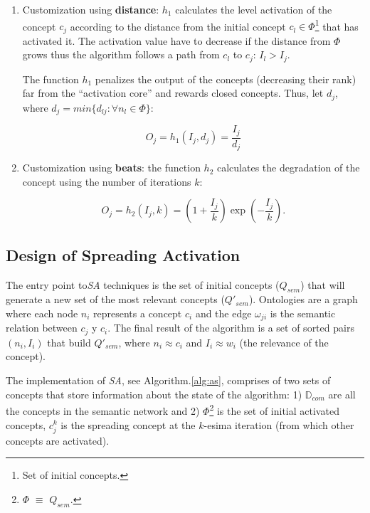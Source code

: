 \documentclass{llncs}
\begin{document}
\begin{description}
\begin{enumerate}
\item Customization using {\bf distance}: $h_1$ calculates the level activation
of the concept $c_j$  according to the distance from the initial concept $c_l
\in \Phi$\footnote{Set of initial concepts.} that has activated it. The
activation value have to decrease if the distance from $\Phi$ grows thus
the algorithm follows a path from $c_l$ to $c_j$: $I_l > I_j$.


The function $h_1$ penalizes the output of the concepts (decreasing their rank)
far from the ``activation core'' and rewards closed concepts. Thus, let $d_j$,
where $d_j = min\{d_{lj}:\forall n_l \in \Phi\}$:


\begin{equation}
 O_j = h_1(I_j,d_j)= \frac{I_j} {d_j}
\end{equation}

\item Customization using {\bf beats}: the function $h_2$ calculates the
degradation of the concept using the number of iterations $k$:


\begin{equation}
 O_j = h_2(I_j,k) = (1+\frac{I_j}{k})\exp(-\frac{I_j}{k}).
\end{equation}

\end{enumerate}

\end{description}

\subsection{Design of Spreading Activation}\label{impl-sa}

The entry point to\textit{SA} techniques is the set of initial concepts
($Q_{sem}$) that will generate a new set of the most relevant concepts
($Q'_{sem}$). Ontologies are a graph where each node $n_i$ represents a concept
$c_i$ and the edge $\omega_{ji}$ is the semantic relation between $c_j$ y $c_i$.
The final result of the algorithm is a set of sorted pairs $(n_i, I_i)$
that build $Q'_{sem}$, where $n_i\approx c_i$ and $I_i\approx w_i$ (the
relevance of the concept).

The implementation of \textit{SA}, see Algorithm.\ref{alg:as}, comprises of two sets of concepts that
store information about the state of the algorithm: 1)
$\mathbb{D}_{com}$ are all the concepts in the semantic network and 2)
$\Phi$\footnote{$\Phi$ $\equiv$ $Q_{sem}$.} is the set of initial activated concepts, $c_j^k$  is 
the spreading concept at the $k$-esima iteration (from which other concepts are activated).
\end{document}
